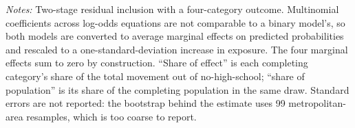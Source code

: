\begin{table}[!htbp]
\centering
\caption{Multinomial Decomposition of the Binary Estimate, 100,000-Observation Draw}
\label{tab:multinomial}
\begin{minipage}{\textwidth}
\footnotesize
\vspace{4pt}
\textit{Notes:} Two-stage residual inclusion with a four-category outcome. Multinomial coefficients across log-odds equations are not comparable to a binary model's, so both models are converted to average marginal effects on predicted probabilities and rescaled to a one-standard-deviation increase in exposure. The four marginal effects sum to zero by construction. ``Share of effect'' is each completing category's share of the total movement out of no-high-school; ``share of population'' is its share of the completing population in the same draw. Standard errors are not reported: the bootstrap behind the estimate uses 99 metropolitan-area resamples, which is too coarse to report.
\end{minipage}
\end{table}

